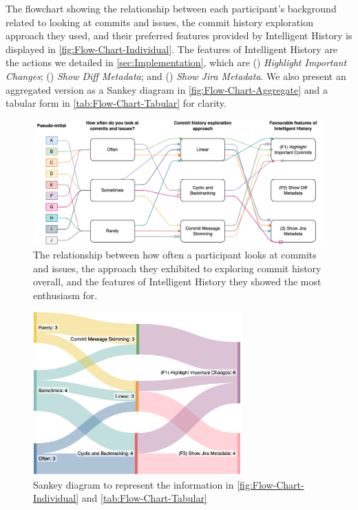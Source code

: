 The flowchart showing the relationship between each participant's background related to looking at commits and issues,
the commit history exploration approach they used, and their preferred features provided by Intelligent History is displayed in \autoref{fig:Flow-Chart-Individual}.
The features of Intelligent History are the actions we detailed in \autoref{sec:Implementation}, which are 
() \textit{Highlight Important Changes}; () \textit{Show Diff Metadata}; and () \textit{Show Jira Metadata}.
We also present an aggregated version as a Sankey diagram in \autoref{fig:Flow-Chart-Aggregate} and a tabular form in \autoref{tab:Flow-Chart-Tabular} for clarity.

\begin{figure}[h]
  \centering
  \includegraphics[width=12cm]{./images/flow-chart-ind.png}
  \caption{
    The relationship between how often a participant looks at commits and issues, the approach they exhibited to exploring commit history overall, and the features of Intelligent History they showed the most enthusiasm for.
  }
  \label{fig:Flow-Chart-Individual}
\end{figure}

\begin{figure}[h]
  \centering
  \includegraphics[width=8cm]{./images/flow-chart-aggr.png}
  \caption{
    Sankey diagram to represent the information in \autoref{fig:Flow-Chart-Individual} and \autoref{tab:Flow-Chart-Tabular}
  }
  \label{fig:Flow-Chart-Aggregate}
\end{figure}

